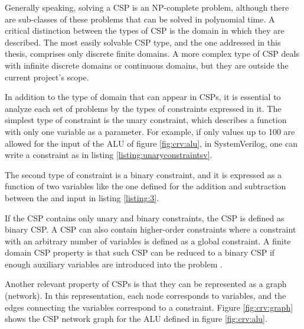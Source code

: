 Generally speaking, solving a CSP is an NP-complete problem, although there are
sub-classes of these problems that can be solved in polynomial time. A critical
distinction between the types of CSP is the domain in which they are described.
The most easily solvable CSP type, and the one addressed in this thesis,
comprises only discrete finite domains. A more complex type of CSP deals with
infinite discrete domains or continuous domains, but they are outside the
current project's scope.

In addition to the type of domain that can appear in CSPs, it is essential to
analyze each set of problems by the types of constraints expressed in it. The
simplest type of constraint is the unary constraint, which describes a function
with only one variable as a parameter. For example, if only values up to 100 are
allowed for the  input of the ALU of figure \ref{fig:crv:alu}, in
SystemVerilog, one can write a constraint as in listing
\ref{listing:unaryconstraintsv}.


The second type of constraint is a binary constraint, and it is expressed as a
function of two variables like the one defined for the addition and subtraction
between the  and  input in listing \ref{listing:3}.

If the CSP contains only unary and binary constraints, the CSP is defined as
binary CSP. A CSP can also contain higher-order constraints where a constraint
with an arbitrary number of variables is defined as a global constraint. A
finite domain CSP property is that such CSP can be reduced to a binary CSP if
enough auxiliary variables are introduced into the problem
\cite{russell2002artificial}.

Another relevant property of CSPs is that they can be represented as a graph
(network). In this representation, each node corresponds to variables, and the
edges connecting the variables correspond to a constraint. Figure
\ref{fig:crv:graph} shows the CSP network graph for the ALU defined in figure
\ref{fig:crv:alu}.

